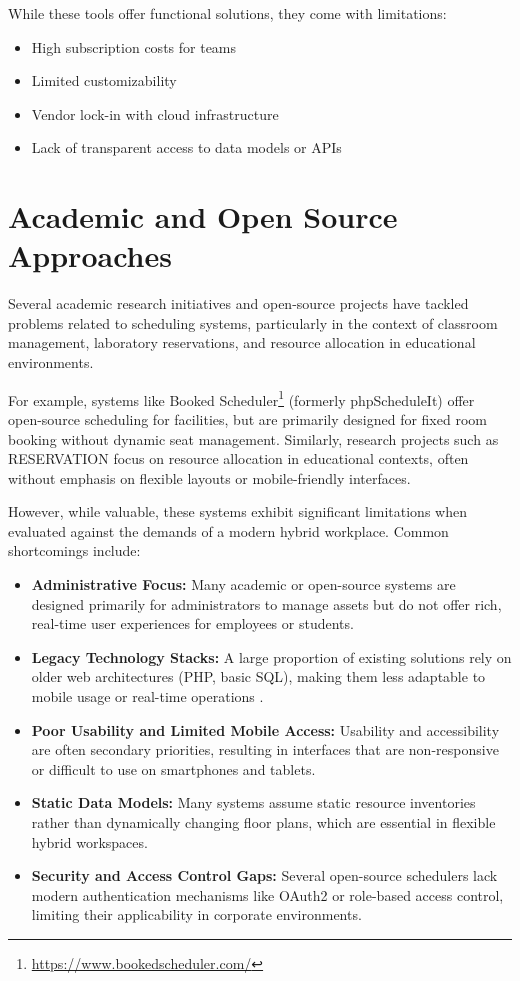 \documentclass[12pt,a4paper]{report}
\begin{document}
While these tools offer functional solutions, they come with limitations:
\begin{itemize}
    \item High subscription costs for teams
    \item Limited customizability
    \item Vendor lock-in with cloud infrastructure
    \item Lack of transparent access to data models or APIs
\end{itemize}

\section{Academic and Open Source Approaches}

Several academic research initiatives and open-source projects have tackled problems related to scheduling systems, particularly in the context of classroom management, laboratory reservations, and resource allocation in educational environments.

For example, systems like Booked Scheduler\footnote{\url{https://www.bookedscheduler.com/}} (formerly phpScheduleIt) offer open-source scheduling for facilities, but are primarily designed for fixed room booking without dynamic seat management. Similarly, research projects such as RESERVATION \cite{ko_reservation_2015} focus on resource allocation in educational contexts, often without emphasis on flexible layouts or mobile-friendly interfaces.

However, while valuable, these systems exhibit significant limitations when evaluated against the demands of a modern hybrid workplace. Common shortcomings include:

\begin{itemize}
    \item \textbf{Administrative Focus:} Many academic or open-source systems are designed primarily for administrators to manage assets but do not offer rich, real-time user experiences for employees or students.
    \item \textbf{Legacy Technology Stacks:} A large proportion of existing solutions rely on older web architectures (PHP, basic SQL), making them less adaptable to mobile usage or real-time operations \cite{paas_trends}.
    \item \textbf{Poor Usability and Limited Mobile Access:} Usability and accessibility are often secondary priorities, resulting in interfaces that are non-responsive or difficult to use on smartphones and tablets.
    \item \textbf{Static Data Models:} Many systems assume static resource inventories rather than dynamically changing floor plans, which are essential in flexible hybrid workspaces.
    \item \textbf{Security and Access Control Gaps:} Several open-source schedulers lack modern authentication mechanisms like OAuth2 or role-based access control, limiting their applicability in corporate environments.
\end{itemize}
\end{document}
